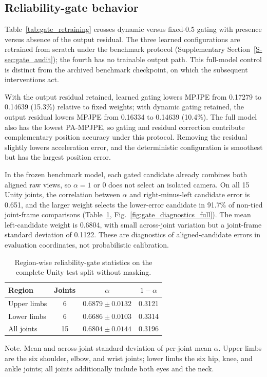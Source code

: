 \documentclass[preprint,12pt]{elsarticle}
\renewcommand{\textit}[1]{\textup{#1}}
\begin{document}
\FloatBarrier
\subsection{Reliability-gate behavior}

Table~\ref{tab:gate_retraining} crosses dynamic versus fixed-0.5 gating with presence versus absence of the output residual. The three learned configurations are retrained from scratch under the benchmark protocol (Supplementary Section~\ref{S-sec:gate_audit}); the fourth has no trainable output path. This full-model control is distinct from the archived benchmark checkpoint, on which the subsequent interventions act.



With the output residual retained, learned gating lowers MPJPE from 0.17279 to 0.14639 (15.3\%) relative to fixed weights; with dynamic gating retained, the output residual lowers MPJPE from 0.16334 to 0.14639 (10.4\%). The full model also has the lowest PA-MPJPE, so gating and residual correction contribute complementary position accuracy under this protocol. Removing the residual slightly lowers acceleration error, and the deterministic configuration is smoothest but has the largest position error.

In the frozen benchmark model, each gated candidate already combines both aligned raw views, so \(\alpha=1\) or 0 does not select an isolated camera. On all 15 Unity joints, the correlation between \(\alpha\) and right-minus-left candidate error is 0.651, and the larger weight selects the lower-error candidate in 91.7\% of non-tied joint-frame comparisons (Table~\ref{tab:gate_region_summary}, Fig.~\ref{fig:gate_diagnostics_full}). The mean left-candidate weight is 0.6804, with small across-joint variation but a joint-frame standard deviation of 0.1122. These are diagnostics of aligned-candidate errors in evaluation coordinates, not probabilistic calibration.

\begin{table}[t]
\centering
\caption{Region-wise reliability-gate statistics on the complete Unity test split without masking.}
\label{tab:gate_region_summary}
\footnotesize
\setlength{\tabcolsep}{6pt}
\renewcommand{\arraystretch}{1.08}
\begin{tabular}{lccc}
\toprule
Region & Joints & \(\alpha\) & \(1-\alpha\) \\
\midrule
Upper limbs & 6 & \(0.6879 \pm 0.0132\) & 0.3121 \\
Lower limbs & 6 & \(0.6686 \pm 0.0103\) & 0.3314 \\
All joints & 15 & \(0.6804 \pm 0.0144\) & 0.3196 \\
\bottomrule
\end{tabular}
\vspace{0.4em}
\begin{minipage}{0.94\linewidth}
\footnotesize
\textit{Note.} Mean and across-joint standard deviation of per-joint mean \(\alpha\). Upper limbs are the six shoulder, elbow, and wrist joints; lower limbs the six hip, knee, and ankle joints; all joints additionally include both eyes and the neck.
\end{minipage}
\end{table}
\end{document}
